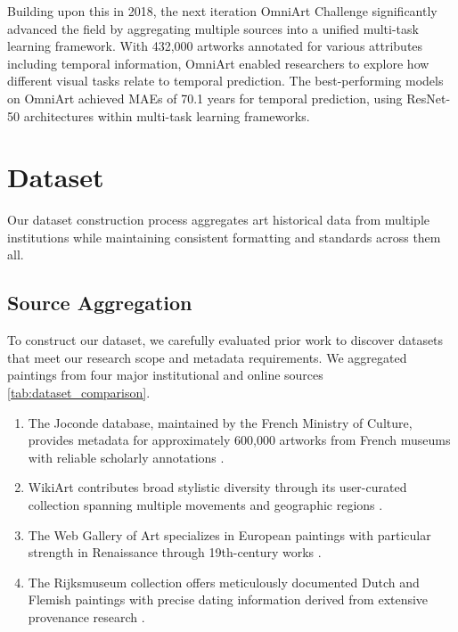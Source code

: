 \documentclass[10pt,twocolumn,letterpaper]{article}
\begin{document}
Building upon this in 2018, the next iteration OmniArt Challenge \cite{Strezoski18} significantly advanced the field by aggregating multiple sources into a unified multi-task learning framework. With 432,000 artworks annotated for various attributes including temporal information, OmniArt enabled researchers to explore how different visual tasks relate to temporal prediction. The best-performing models on OmniArt achieved MAEs of 70.1 years for temporal prediction, using ResNet-50 architectures within multi-task learning frameworks.

\section{Dataset}

Our dataset construction process aggregates art historical data from multiple institutions while maintaining consistent formatting and standards across them all.

\subsection{Source Aggregation}

To construct our dataset, we carefully evaluated prior work to discover datasets that meet our research scope and metadata requirements. We aggregated paintings from four major institutional and online sources \ref{tab:dataset_comparison}.

\begin{enumerate}[leftmargin=1.2em,label=(\arabic*)]
    \item The Joconde database, maintained by the French Ministry of Culture, provides metadata for approximately 600,000 artworks from French museums with reliable scholarly annotations \cite{JocondeTerms}.
    \item  WikiArt contributes broad stylistic diversity through its user-curated collection spanning multiple movements and geographic regions \cite{Karayev14, WikiArtTerms}. 
    \item The Web Gallery of Art specializes in European paintings with particular strength in Renaissance through 19th-century works \cite{Seguin16, WGATerms}.
    \item The Rijksmuseum collection offers meticulously documented Dutch and Flemish paintings with precise dating information derived from extensive provenance research \cite{Mensink14}.
\end{enumerate} 
\end{document}
